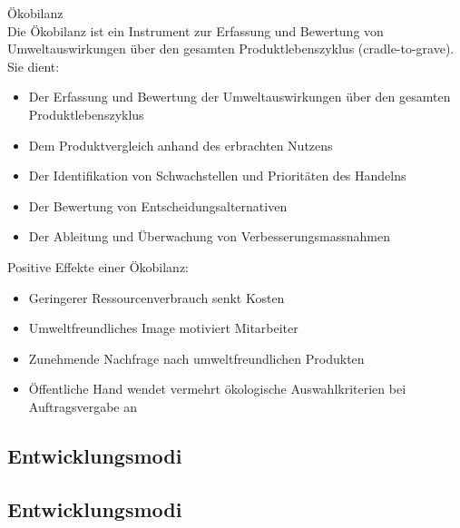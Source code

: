 \begin{definition}{Ökobilanz}\\
Die Ökobilanz ist ein Instrument zur Erfassung und Bewertung von Umweltauswirkungen über den gesamten Produktlebenszyklus (cradle-to-grave). Sie dient:
\begin{itemize}
    \item Der Erfassung und Bewertung der Umweltauswirkungen über den gesamten Produktlebenszyklus
    \item Dem Produktvergleich anhand des erbrachten Nutzens
    \item Der Identifikation von Schwachstellen und Prioritäten des Handelns
    \item Der Bewertung von Entscheidungsalternativen
    \item Der Ableitung und Überwachung von Verbesserungsmassnahmen
\end{itemize}

Positive Effekte einer Ökobilanz:
\begin{itemize}
    \item Geringerer Ressourcenverbrauch senkt Kosten
    \item Umweltfreundliches Image motiviert Mitarbeiter
    \item Zunehmende Nachfrage nach umweltfreundlichen Produkten
    \item Öffentliche Hand wendet vermehrt ökologische Auswahlkriterien bei Auftragsvergabe an
\end{itemize}
\end{definition}

\subsection{Entwicklungsmodi}

\subsection{Entwicklungsmodi}

